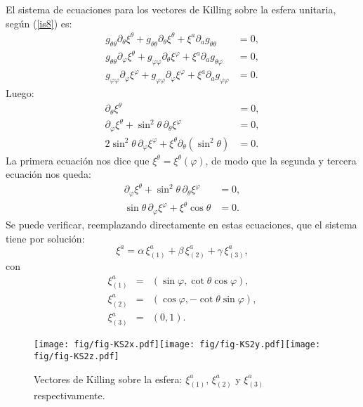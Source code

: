El sistema de ecuaciones para los vectores de Killing sobre la esfera unitaria,
seg\'{u}n (\ref{is8}) es:
\begin{align}
g_{\theta\theta}\partial_\theta\xi^\theta+g_{\theta\theta}\partial_\theta\xi^\theta +\xi^a\partial_ag_{\theta\theta}  &  =0,\label{isej12}\\
g_{\theta\theta}\partial_\varphi\xi^\theta+g_{\varphi\varphi}\partial_\theta\xi^\varphi +\xi^a\partial_ag_{\theta\varphi}  &  =0, \\
g_{\varphi\varphi}\partial_\varphi\xi^\varphi+g_{\varphi\varphi}\partial_\varphi\xi^\varphi +\xi^a\partial_ag_{\varphi\varphi}  &  =0.
\end{align}
Luego:
\begin{align}
\partial_\theta\xi^\theta  &  =0,\label{isej13}\\
\partial_\varphi\xi^\theta+\sin^2\theta\,\partial_\theta\xi^\varphi  &  =0, \\
2\sin^2\theta\,\partial_\varphi\xi^\varphi+\xi^\theta\partial_\theta(\sin^2\theta)  & =0.
\end{align}
La primera ecuación nos dice que $\xi^\theta=\xi^\theta(\varphi)$, de modo que la
segunda y tercera ecuación nos queda:
\begin{align}
\partial_\varphi\xi^\theta+\sin^2\theta\,\partial_\theta\xi^\varphi  &
=0,\label{isej14}\\
\sin\theta\,\partial_\varphi\xi^\varphi+\xi^\theta\cos\theta  &  =0.
\end{align}
Se puede verificar, reemplazando directamente en estas ecuaciones, que el
sistema tiene por solución:
\begin{equation}
\xi^a=\alpha\,\xi^a_{(1)} +\beta\,\xi^a_{(2)} +\gamma\,\xi^a_{(3)}
,\label{isej15}
\end{equation}
con
\begin{eqnarray}
\xi^a_{(1)} &=&(\sin\varphi, \cot\theta\cos\varphi ), \\
\xi^a_{(2)} &=&(\cos\varphi,-\cot\theta\sin\varphi) , \\
\xi^a_{(3)} &=&(0,1).
\end{eqnarray}

\begin{center}
\begin{figure}[H]
\centerline{\texttt{[image: fig/fig-KS2x.pdf]}\hfill\texttt{[image: fig/fig-KS2y.pdf]}\hfill\texttt{[image: fig/fig-KS2z.pdf]}}
\caption{Vectores de Killing sobre la esfera: 
$\xi^a_{(1)}$, $\xi^a_{(2)}$ y $\xi^a_{(3)}$ respectivamente.}
\label{KS2}
\end{figure}
\end{center}

